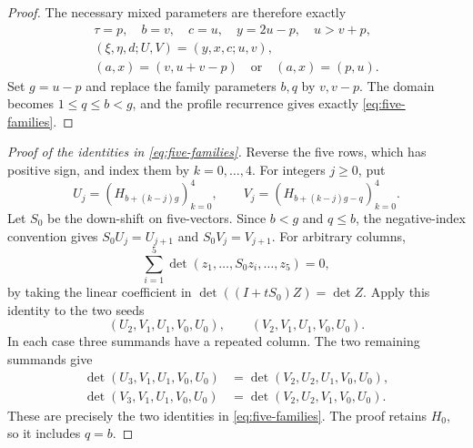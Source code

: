 \documentclass[11pt,a4paper]{amsart}
\numberwithin{equation}{section}
\theoremstyle{plain}
\theoremstyle{definition}
\begin{document}
\begin{proof}
The necessary mixed parameters are therefore exactly
\begin{equation}\label{eq:cross-output}
 \begin{gathered}
 \tau=p,\quad b=v,\quad c=u,\quad y=2u-p,\quad u>v+p,\\
 (\xi,\eta,d;U,V)=(y,x,c;u,v),\\
 (a,x)=(v,u+v-p)\quad\text{or}\quad(a,x)=(p,u).
 \end{gathered}
\end{equation}
Set \(g=u-p\) and replace the family parameters \(b,q\) by
\(v,v-p\).  The domain becomes \(1\le q\le b<g\), and the profile
recurrence gives exactly \eqref{eq:five-families}.  

\end{proof}

\begin{proof}[Proof of the identities in \eqref{eq:five-families}]
Reverse the five rows, which has positive sign,
and index them by \(k=0,\ldots,4\).  For integers \(j\ge0\), put
\[
 U_j=(H_{b+(k-j)g})_{k=0}^4,\qquad
 V_j=(H_{b+(k-j)g-q})_{k=0}^4.
\]
Let \(S_0\) be the down-shift on five-vectors.  Since \(b<g\) and
\(q\le b\), the negative-index convention gives
\(S_0U_j=U_{j+1}\) and \(S_0V_j=V_{j+1}\).  For arbitrary columns,
\[
 \sum_{i=1}^5
 \det(z_1,\ldots,S_0z_i,\ldots,z_5)=0,
\]
by taking the linear coefficient in
\(\det((I+tS_0)Z)=\det Z\).  Apply this identity to the two seeds
\[
 (U_2,V_1,U_1,V_0,U_0),\qquad
 (V_2,V_1,U_1,V_0,U_0).
\]
In each case three summands have a repeated column.  The two remaining summands give
\[
 \begin{aligned}
 \det(U_3,V_1,U_1,V_0,U_0)
   &=\det(V_2,U_2,U_1,V_0,U_0),\\
 \det(V_3,V_1,U_1,V_0,U_0)
   &=\det(V_2,U_2,V_1,V_0,U_0).
 \end{aligned}
\]
These are precisely the two identities in \eqref{eq:five-families}.  
The proof retains \(H_0\), so it includes \(q=b\).  
\end{proof}
\end{document}
